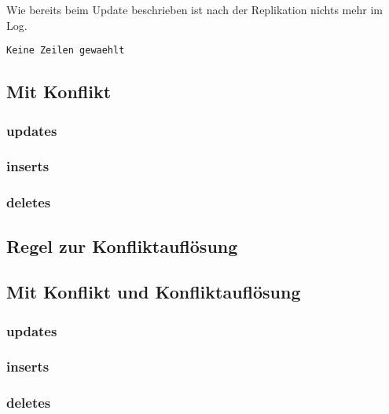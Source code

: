 \documentclass[11pt,a4paper,parskip=half]{scrartcl}
\begin{document}
Wie bereits beim Update beschrieben ist nach der Replikation nichts mehr im Log.
\begin{lstlisting}
Keine Zeilen gewaehlt
\end{lstlisting}

\subsection{Mit Konflikt}
\subsubsection{updates}

\subsubsection{inserts}

\subsubsection{deletes}

\subsection{Regel zur Konfliktauflösung}

\subsection{Mit Konflikt und Konfliktauflösung}
\subsubsection{updates}

\subsubsection{inserts}

\subsubsection{deletes}
\end{document}
